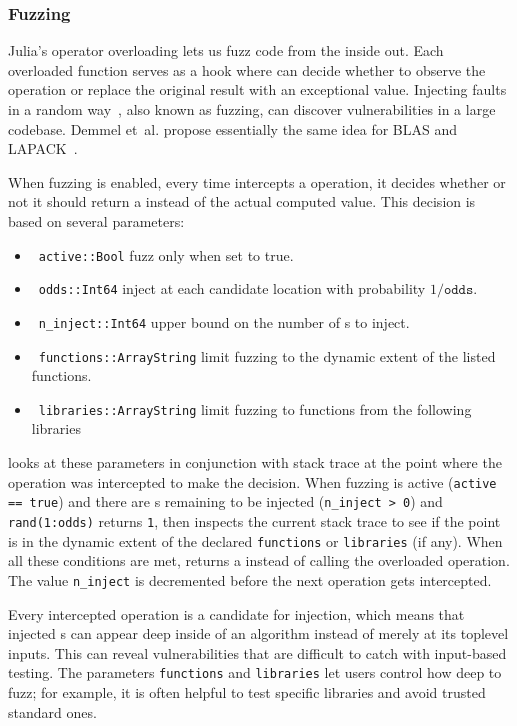 \documentclass{juliacon}
\begin{document}
\subsubsection{Fuzzing}

Julia's operator overloading lets us fuzz code from the inside
out.
Each overloaded function serves as a hook where \TF{} can decide whether to observe
the operation or replace the original result with an exceptional value.
Injecting faults in a random way~\cite{hamlet1994random}, also known as fuzzing,
can discover vulnerabilities in a large codebase.
Demmel et~al. propose essentially the same idea for BLAS and
LAPACK~\cite{ddghlllprr-correctness-2022}.

When fuzzing is enabled, every time \TF{} intercepts a \fp{}
operation, it decides whether or not it should return a \Nan{} instead
of the actual computed value.
This decision is based on several parameters:

\begin{itemize}
\item $\,$ \texttt{active::Bool} fuzz only when set to true.
\item $\,$ \texttt{odds::Int64} inject at each candidate location with probability $1 / \texttt{odds}$.
\item $\,$ \texttt{n\_inject::Int64} upper bound on the number of \Nan{}s to inject.
\item $\,$ \texttt{functions::Array{String}} limit fuzzing to the dynamic extent of the listed functions.
\item $\,$ \texttt{libraries::Array{String}} limit fuzzing to functions from the following libraries
\end{itemize}

\TF{} looks at these parameters in conjunction with stack trace at the
point where the operation was intercepted to make the decision.
When fuzzing is active (\texttt{active == true})
and there are \Nan{}s remaining to be injected (\texttt{n\_inject > 0})
and \texttt{rand(1:odds)} returns \texttt{1}, then \TF{} inspects the
current stack trace to see if the point is in the dynamic extent of
the declared \texttt{functions} or \texttt{libraries} (if any).
When all these conditions are met,
\TF{} returns a \NaN{} instead of calling the overloaded operation.
The value \texttt{n\_inject} is decremented before the next operation
gets intercepted.

Every intercepted operation is a candidate for injection,
which means that injected \Nan{}s can appear deep
inside of an algorithm instead of merely at its toplevel inputs.
This can reveal vulnerabilities that are difficult to catch
with input-based testing.
The parameters \texttt{functions} and \texttt{libraries} let
users control how deep to fuzz; for example, it is often helpful
to test specific libraries and avoid trusted standard ones.
\end{document}
